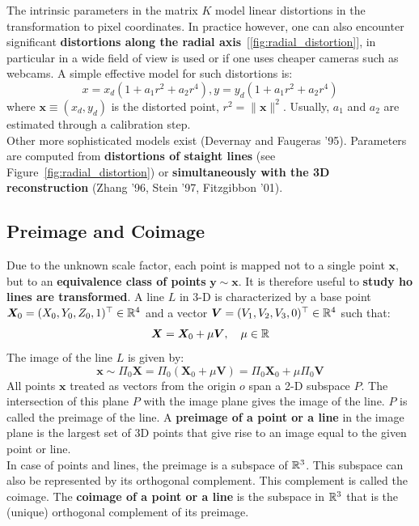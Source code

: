 The intrinsic parameters in the matrix $K$ model linear distortions
in the transformation to pixel coordinates.
In practice however, one can also encounter significant
\textbf{distortions along the radial axis}~[\ref{fig:radial_distortion}],
in particular in a wide field of view is used or if one uses cheaper cameras
such as webcams.
A simple effective model for such distortions is:
\[
	x = x_d ( 1 + a_1 r^2 + a_2 r^4 ),
	y = y_d ( 1 + a_1 r^2 + a_2 r^4 )
\]
where $\bm{x} \equiv (x_d, y_d)$ is the distorted point,
$r^2 = \|\bm{x}\|^2$.
Usually, $a_1$ and $a_2$ are estimated through a calibration step.\\

Other more sophisticated models exist (Devernay and Faugeras '95).
Parameters are computed from
\textbf{distortions of staight lines} (see Figure~\ref{fig:radial_distortion})
or \textbf{simultaneously with the 3D reconstruction}
(Zhang '96, Stein '97, Fitzgibbon '01).


\subsection{Preimage and Coimage}%
\label{sub:preimage_and_coimage}


Due to the unknown scale factor, each point is mapped not to a single
point $\bm{x}$, but to an \textbf{equivalence class of points} $\bm{ y \sim x}$.
It is therefore useful to \textbf{study ho lines are transformed}.
A line $L$ in 3-D is characterized by a base point
$\bm{X}_0 = (X_0, Y_0, Z_0, 1)^{\top} \in \mathbb{R}^4$ and a vector
$\bm{V} = (V_1, V_2, V_3, 0)^{\top} \in \mathbb{R}^4$ such that:
\[
	\bm{X} = \bm{X}_0 + \mu \bm{V}, \quad \mu \in \mathbb{R}
\]
The image of the line $L$ is given by:
\[
	\bm{x} \sim \Pi_0 \bm{X}
	= \Pi_0 ( \bm{X}_0 + \mu \bm{V} )
	= \Pi_0 \bm{X}_0 + \mu \Pi_0 \bm{V}
\]
All points $\bm{x}$ treated as vectors from the origin $o$ span a 2-D
subspace $P$. The intersection of this plane $P$ with the image plane
gives the image of the line.
$P$ is called the preimage of the line.
A \textbf{preimage of a point or a line} in the image plane
is the largest set of 3D points that give rise to an image
equal to the given point or line.\\

In case of points and lines, the preimage is a subspace of $\mathbb{R}^3$.
This subspace can also be represented by its orthogonal complement.
This complement is called the coimage.
The \textbf{coimage of a point or a line} is the subspace in $\mathbb{R}^3$
that is the (unique) orthogonal complement of its preimage.\\

